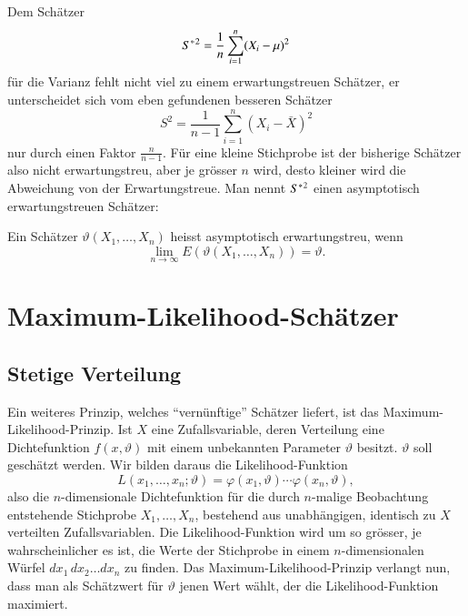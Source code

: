 Dem Schätzer
\begin{equation}
S^{*}\mathstrut^{2}=\frac1n\sum_{i=1}^n(X_i-\mu)^2
\end{equation}
für die Varianz fehlt nicht viel zu einem erwartungstreuen Schätzer,
er unterscheidet sich vom eben gefundenen besseren Schätzer
\begin{equation}
S^2=\frac1{n-1}\sum_{i=1}^n(X_i-\bar X)^2
\end{equation}
nur durch einen Faktor $\frac{n}{n-1}$.
Für eine kleine Stichprobe ist
der bisherige Schätzer also nicht erwartungstreu, aber je grösser $n$
wird, desto kleiner wird die Abweichung von der Erwartungstreue.
Man
nennt $S^{*}\mathstrut^{2}$ einen asymptotisch erwartungstreuen Schätzer:
\begin{definition}
Ein Schätzer $\vartheta(X_1,\dots,X_n)$ heisst asymptotisch erwartungstreu,
wenn
\begin{equation}
\lim_{n\to\infty}E(\vartheta(X_1,\dots,X_n))=\vartheta.
\end{equation}
\end{definition}

\section{Maximum-Likelihood-Schätzer} \label{section-maximum-likelihood-schaetzer}
\subsection{Stetige Verteilung}
Ein weiteres Prinzip, welches ``vernünftige'' Schätzer liefert,
ist das Maximum-Likelihood-Prinzip.
Ist $X$ eine Zufallsvariable, deren
Verteilung eine Dichtefunktion $f(x,\vartheta)$ mit einem unbekannten
Parameter $\vartheta$ besitzt. $\vartheta$ soll geschätzt werden.
Wir bilden daraus die Likelihood-Funktion
%
\begin{equation}
L(x_1,\dots,x_n;\vartheta)=\varphi(x_1,\vartheta)\cdots \varphi(x_n,\vartheta),
\label{likelihood-funktion}
\end{equation}
also die $n$-dimensionale Dichtefunktion für die durch $n$-malige 
Beobachtung entstehende Stichprobe $X_1,\dots,X_n$, bestehend aus
unabhängigen, identisch zu $X$ verteilten Zufallsvariablen.
Die Likelihood-Funktion wird um so grösser, je wahrscheinlicher
es ist, die Werte der Stichprobe in einem $n$-dimensionalen Würfel
$dx_1\,dx_2\dots dx_n$ zu finden.
Das Maximum-Likelihood-Prinzip
verlangt nun, dass man als Schätzwert für $\vartheta$ jenen Wert
wählt, der die Likelihood-Funktion maximiert.

